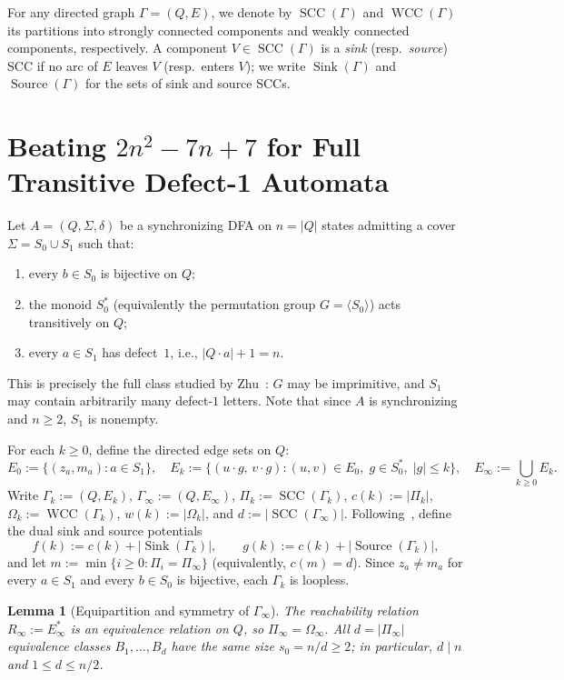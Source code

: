 \documentclass[11pt,a4paper]{article}
\newtheorem{lemma}[theorem]{Lemma}
\theoremstyle{definition}
\theoremstyle{remark}
\newcommand{\SCC}{\operatorname{SCC}}
\newcommand{\WCC}{\operatorname{WCC}}
\newcommand{\Sink}{\operatorname{Sink}}
\newcommand{\Source}{\operatorname{Source}}
\begin{document}
For any directed graph $\Gamma = (Q, E)$, we denote by $\SCC(\Gamma)$ and $\WCC(\Gamma)$ its partitions into strongly connected components and weakly connected components, respectively. A component $V \in \SCC(\Gamma)$ is a \emph{sink} (resp.\ \emph{source}) SCC if no arc of $E$ leaves $V$ (resp.\ enters $V$); we write $\Sink(\Gamma)$ and $\Source(\Gamma)$ for the sets of sink and source SCCs.

\section{Beating $2n^2 - 7n + 7$ for Full Transitive Defect-1 Automata}\label{sec:transitive}

Let $A = (Q, \Sigma, \delta)$ be a synchronizing DFA on $n = |Q|$ states admitting a cover $\Sigma = S_0 \cup S_1$ such that:
\begin{enumerate}[label=(\roman*),leftmargin=*,nosep]
  \item every $b \in S_0$ is bijective on $Q$;
  \item the monoid $S_0^*$ (equivalently the permutation group $G = \langle S_0 \rangle$) acts transitively on $Q$;
  \item every $a \in S_1$ has defect~$1$, i.e., $|Q \cdot a| + 1 = n$.
\end{enumerate}
This is precisely the full class studied by Zhu~\cite{Zhu2024}: $G$ may be imprimitive, and $S_1$ may contain arbitrarily many defect-$1$ letters. Note that since $A$ is synchronizing and $n \ge 2$, $S_1$ is nonempty.

For each $k \ge 0$, define the directed edge sets on $Q$:
\[
  E_0 := \{(z_a, m_a) : a \in S_1\}, \quad
  E_k := \{(u \cdot g,\, v \cdot g) : (u, v) \in E_0,\; g \in S_0^*,\; |g| \le k\}, \quad
  E_\infty := \bigcup_{k \ge 0} E_k.
\]
Write $\Gamma_k := (Q, E_k)$, $\Gamma_\infty := (Q, E_\infty)$, $\Pi_k := \SCC(\Gamma_k)$, $c(k) := |\Pi_k|$, $\Omega_k := \WCC(\Gamma_k)$, $w(k) := |\Omega_k|$, and $d := |\SCC(\Gamma_\infty)|$. Following~\cite{Zhu2024}, define the dual sink and source potentials
\[
  f(k) := c(k) + |\Sink(\Gamma_k)|, \qquad g(k) := c(k) + |\Source(\Gamma_k)|,
\]
and let $m := \min\{i \ge 0 : \Pi_i = \Pi_\infty\}$ (equivalently, $c(m) = d$). Since $z_a \neq m_a$ for every $a \in S_1$ and every $b \in S_0$ is bijective, each $\Gamma_k$ is loopless.

\begin{lemma}[Equipartition and symmetry of $\Gamma_\infty$]\label{lem:equipartition}
The reachability relation $R_\infty := E_\infty^*$ is an equivalence relation on $Q$, so $\Pi_\infty = \Omega_\infty$. All $d = |\Pi_\infty|$ equivalence classes $B_1, \dots, B_d$ have the same size $s_0 = n / d \ge 2$; in particular, $d \mid n$ and $1 \le d \le n / 2$.
\end{lemma}
\end{document}
